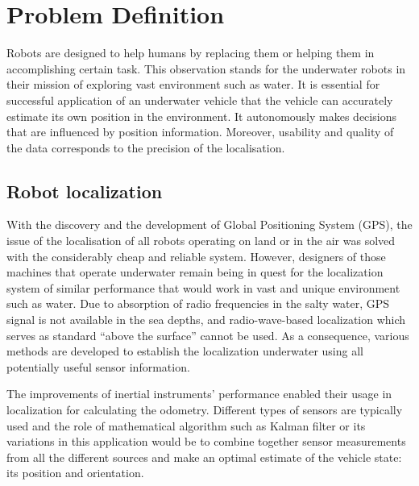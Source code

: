 \chapter{Problem Definition} \label{chap:problem-def}
Robots are designed to help humans by replacing them or helping them in accomplishing certain task. This observation stands for the underwater robots in their mission of exploring vast environment such as water. It is essential for successful application of an underwater vehicle that the vehicle can accurately estimate its own position in the environment. It autonomously makes decisions that are influenced by position information. Moreover, usability and quality of the data corresponds to the precision of the localisation.
\section{Robot localization}
With the discovery and the development of Global Positioning System (GPS), the issue of the localisation of all robots operating on land or in the air was solved with the considerably cheap and reliable system. However, designers of those machines that operate underwater remain being in quest for the localization system of similar performance that would work in vast and unique environment such as water. Due to absorption of radio frequencies in the salty water, GPS signal is not available in the sea depths, and radio-wave-based localization which serves as standard ``above the surface'' cannot be used. As a consequence, various methods are developed to establish the localization underwater using all potentially useful sensor information. 

The improvements of inertial instruments' performance enabled their usage in localization for calculating the odometry. Different types of sensors are typically used and the role of mathematical algorithm such as Kalman filter or its variations in this application would be to combine together sensor measurements from all the different sources and make an optimal estimate of the vehicle state: its position and orientation. 

